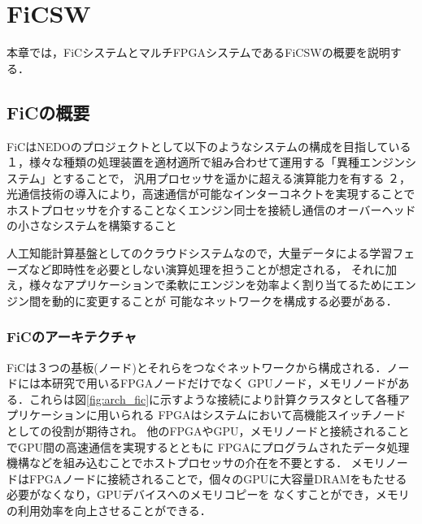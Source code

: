 \chapter{FiCSW}
{
\label{chap:ficsw}
本章では，FiCシステムとマルチFPGAシステムであるFiCSWの概要を説明する．

\section{FiCの概要}
\label{sec:about_fic}
FiCはNEDOのプロジェクトとして以下のようなシステムの構成を目指している
１，様々な種類の処理装置を適材適所で組み合わせて運用する「異種エンジンシステム」とすることで，
汎用プロセッサを遥かに超える演算能力を有する
２，光通信技術の導入により，高速通信が可能なインターコネクトを実現することで
ホストプロセッサを介することなくエンジン同士を接続し通信のオーバーヘッドの小さなシステムを構築すること

人工知能計算基盤としてのクラウドシステムなので，大量データによる学習フェーズなど即時性を必要としない演算処理を担うことが想定される，
それに加え，様々なアプリケーションで柔軟にエンジンを効率よく割り当てるためにエンジン間を動的に変更することが
可能なネットワークを構成する必要がある．
\subsection{FiCのアーキテクチャ}
\label{sec:arch_fic}
FiCは３つの基板(ノード)とそれらをつなぐネットワークから構成される．ノードには本研究で用いるFPGAノードだけでなく
GPUノード，メモリノードがある．これらは図\ref{fig:arch_fic}に示すような接続により計算クラスタとして各種アプリケーションに用いられる
FPGAはシステムにおいて高機能スイッチノードとしての役割が期待され。
他のFPGAやGPU，メモリノードと接続されることでGPU間の高速通信を実現するとともに
FPGAにプログラムされたデータ処理機構などを組み込むことでホストプロセッサの介在を不要とする．
メモリノードはFPGAノードに接続されることで，個々のGPUに大容量DRAMをもたせる必要がなくなり，GPUデバイスへのメモリコピーを
なくすことができ，メモリの利用効率を向上させることができる．
}
